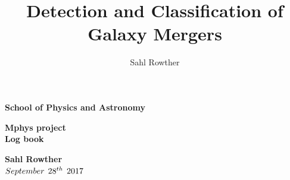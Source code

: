 \documentclass[11pt, oneside]{article}   	%
\title{Detection and Classification of Galaxy Mergers}
\author{Sahl Rowther}
\begin{document}
\pagestyle{empty}                       %
\begin{center}
        {\Huge\bf School of Physics and Astronomy
        \vspace*{5mm}}  
\end{center}                  

\hfill
\begin{center}
\begin{minipage}[t]{40mm}   
\end{minipage}
\end{center}
\par\noindent                                           %
\vspace*{3mm}
\begin{center}
        \LARGE\bf Mphys project\\       %
        \large\bf Log book 
\end{center}
\vspace*{0.5cm}
\begin{center}
        \bf Sahl Rowther \\                           %
        $September\hspace*{0.15cm}28^{th}\hspace*{0.15cm}2017$                                    %
\end{center}
\vspace*{5mm}
\begin{abstract}
\noindent 
\end{abstract}
\end{document}
